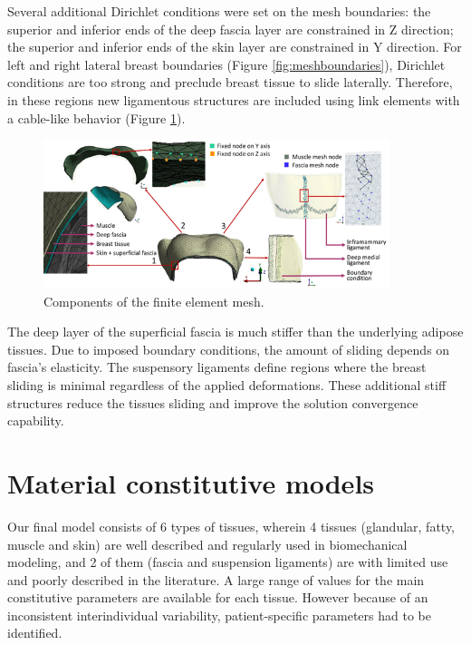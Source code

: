 Several additional Dirichlet conditions were set on the mesh boundaries: the superior and inferior ends of the deep fascia layer are constrained in Z direction; the superior and inferior ends of the skin layer are constrained in Y direction. For left and right lateral breast boundaries (Figure \ref{fig:meshboundaries}), Dirichlet conditions are too strong and preclude breast tissue to slide laterally. Therefore, in these regions new ligamentous structures are included using link elements with a cable-like behavior (Figure \ref{fig:mesh_components_BC}).



\begin{figure}[!h]
\centering
\includegraphics[width=0.9\textwidth,keepaspectratio]{figures/mesh_components.png} 
\caption{Components of the finite element mesh.}\label{fig:mesh_components_BC}
\end{figure}

 The deep layer of the superficial fascia is much stiffer than the underlying adipose tissues. Due to imposed boundary conditions, the amount of sliding depends on fascia's elasticity. The suspensory ligaments define regions where the breast sliding is minimal regardless of the applied deformations. These additional stiff structures reduce the tissues sliding and improve the solution convergence capability. 

\section{Material constitutive models}
\label{section:myConstitutivModels}

Our final model consists of 6 types of tissues, wherein 4 tissues (glandular, fatty, muscle and skin) are well described and regularly used in biomechanical modeling, and 2 of them (fascia and suspension ligaments) are with limited use and poorly described in the literature. A large range of values for the main constitutive parameters are available for each tissue. However because of an inconsistent interindividual variability, patient-specific parameters had to be identified.  


